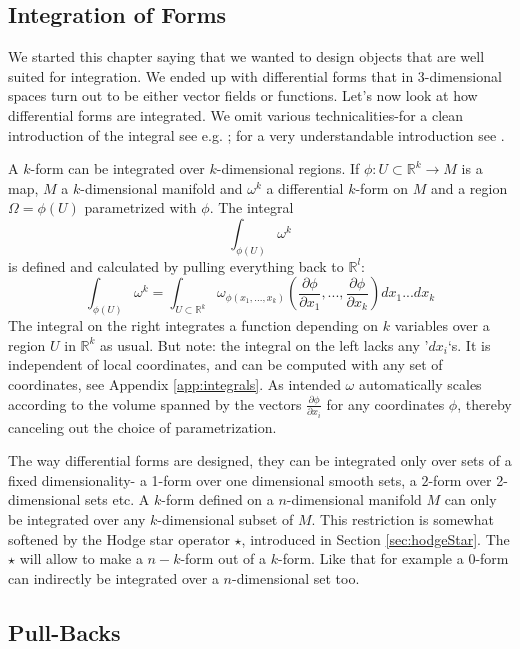 \subsection{Integration of Forms}
\label{sec:integralOfForms}
We started this chapter saying that we wanted to design objects that are well suited for integration. We ended up with differential forms that in 3-dimensional spaces turn out to be either vector fields or functions. Let's now look at how differential forms are integrated. We omit various technicalities-for a clean introduction of the integral see e.g. \cite{globalAnalysis}; for a very understandable introduction see \cite{bachman2006geometric}.

A $k$-form can be integrated over $k$-dimensional regions. If $\phi : U \subset \mathbb R^k \to M$ is a map, $M$ a $k$-dimensional manifold and $\omega^k$ a differential $k$-form on $M$ and a region $\Omega = \phi(U)$ parametrized with $\phi$. The integral 
\[\int_{\phi(U)} \omega^k \]
is defined and calculated by pulling everything back to $\mathbb R^l$:
\[\int_{\phi(U)} \omega^k = \int_{U\subset\mathbb R^k} \omega_{\phi(x_1,...,x_k)}(\frac{\partial \phi}{\partial x_1},...,\frac{\partial \phi}{\partial x_k}) d x_1...d x_k\]
The integral on the right integrates a function depending on $k$ variables over a region $U$ in $\mathbb R^k$ as usual. But note: the integral on the left  lacks any '$d x_i$`s. It is independent of local coordinates, and can be computed with any set of coordinates, see Appendix \ref{app:integrals}. As intended $\omega$ automatically scales according to the volume spanned by the vectors $\frac{\partial \phi}{\partial x_i}$ for any coordinates $\phi$, thereby canceling out the choice of parametrization.

The way differential forms are designed, they can be integrated only over sets of a fixed dimensionality- a 1-form over one dimensional smooth sets, a $2$-form over 2-dimensional sets etc. A $k$-form defined on a $n$-dimensional manifold $M$ can only be integrated over any $k$-dimensional subset of $M$. This restriction is somewhat softened by the Hodge star operator $\star$, introduced in Section \ref{sec:hodgeStar}. The $\star$ will allow to make a $n-k$-form out of a $k$-form. Like that for example a $0$-form can indirectly be integrated over a $n$-dimensional set too.

\subsection{Pull-Backs}
\label{sec:pullbacks}

